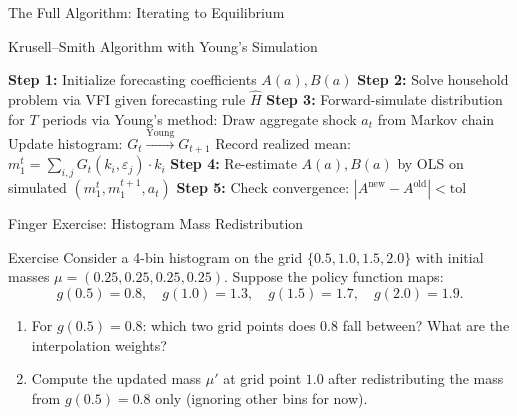 \documentclass[aspectratio=169,11pt]{beamer}
\begin{document}
\begin{frame}{The Full Algorithm: Iterating to Equilibrium}
\begin{block}{Krusell--Smith Algorithm with Young's Simulation}
\begin{algorithmic}
\footnotesize
\STATE \textbf{Step 1:} Initialize forecasting coefficients $A(a), B(a)$
\REPEAT
    \STATE \textbf{Step 2:} Solve household problem via VFI given forecasting rule $\hat{H}$
    \STATE \textbf{Step 3:} Forward-simulate distribution for $T$ periods via Young's method:
        \STATE Draw aggregate shock $a_t$ from Markov chain
        \STATE Update histogram: $G_t \xrightarrow{\text{Young}} G_{t+1}$
        \STATE Record realized mean: $m_1^t = \sum_{i,j} G_t(k_i, \varepsilon_j) \cdot k_i$
    \ENDFOR
    \STATE \textbf{Step 4:} Re-estimate $A(a), B(a)$ by OLS on simulated $(m_1^t, m_1^{t+1}, a_t)$
    \STATE \textbf{Step 5:} Check convergence: $|A^{\text{new}} - A^{\text{old}}| < \text{tol}$
\end{algorithmic}
\end{block}
\end{frame}

\begin{frame}{\exercisepause{} Finger Exercise: Histogram Mass Redistribution}
\begin{exampleblock}{Exercise}
Consider a 4-bin histogram on the grid $\{0.5, 1.0, 1.5, 2.0\}$ with initial masses $\mu = (0.25, 0.25, 0.25, 0.25)$.  Suppose the policy function maps:
\[
g(0.5) = 0.8, \quad g(1.0) = 1.3, \quad g(1.5) = 1.7, \quad g(2.0) = 1.9.
\]
\begin{enumerate}
    \item For $g(0.5) = 0.8$: which two grid points does 0.8 fall between?  What are the interpolation weights?
    \item Compute the updated mass $\mu'$ at grid point $1.0$ after redistributing the mass from $g(0.5) = 0.8$ only (ignoring other bins for now).
\end{enumerate}
\end{exampleblock}
\end{frame}
\end{document}
